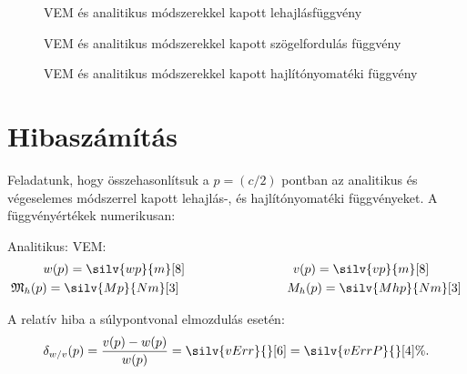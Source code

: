 \documentclass[a4paper, 12pt]{scrartcl}
\begin{document}
\begin{figure}[H]
  \hfill
  
  \vspace{-3mm}
  \caption{VEM és \textcolor{cyan!40!black}{ana}\textcolor{yellow!40!black}{liti}\textcolor{red!40!black}{kus} módszerekkel kapott lehajlásfüggvény}
  \label{fig:plot-v}
\end{figure}
\vspace{-3mm}
\begin{figure}[H]
  \hfill
  
  \vspace{-3mm}
  \caption{VEM és \textcolor{cyan!40!black}{ana}\textcolor{yellow!40!black}{liti}\textcolor{red!40!black}{kus} módszerekkel kapott szögelfordulás függvény}
  \label{fig:plot-phi}
\end{figure}
\vspace{-3mm}
\begin{figure}[H]
  \hfill
  
  \vspace{-3mm}
  \caption{VEM és \textcolor{cyan!40!black}{ana}\textcolor{yellow!40!black}{liti}\textcolor{red!40!black}{kus} módszerekkel kapott hajlítónyomatéki függvény}
  \label{fig:plot-Mh}
\end{figure}

\section{Hibaszámítás}

Feladatunk, hogy összehasonlítsuk a $p = (c / 2)$ pontban az analitikus és
végeselemes módszerrel kapott lehajlás-, és hajlítónyomatéki függvényeket.
A függvényértékek numerikusan:

\hspace{4cm} Analitikus: \hfill VEM: \hspace{5cm}
\begin{gather}
  w(p) = \silv{wp}{m}[8]
  \hspace{3cm}
  v(p) = \silv{vp}{m}[8]
  \\
  \spec M_h(p) = \silv{Mp}{Nm}[3]
  \hspace{3cm}
  M_h(p) = \silv{Mhp}{Nm}[3]
\end{gather}

A relatív hiba a súlypontvonal elmozdulás esetén:
\begin{equation}
  \delta_{w/v}(p)
  = \frac{v(p) - w(p)}{w(p)}
  = \silv{vErr}{}[6]
  = \silv{vErrP}{}[4] \%
  \text.
  \label{eq:v-rel}
\end{equation}
\end{document}
